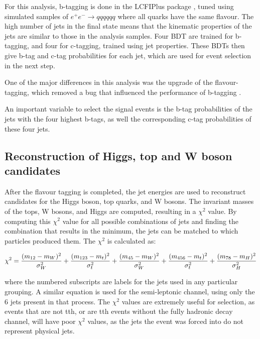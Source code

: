 For this analysis, b-tagging is done in the LCFIPlus package \cite{lcfiplus}, tuned using simulated samples of $e^+ e^- \rightarrow qqqqqq$ where all quarks have the same flavour. The high number of jets in the final state means that the kinematic properties of the jets are similar to those in the analysis samples. Four \acrfull{BDT} are trained for b-tagging, and four for c-tagging, trained using jet properties. These \acrshort{BDT}s then give b-tag and c-tag probabilities for each jet, which are used for event selection in the next step. %

One of the major differences in this analysis was the upgrade of the flavour-tagging, which removed a bug that influenced the performance of b-tagging \cite{clic-yukawa-coupling-2014}.

An important variable to select the signal events is the b-tag probabilities of the jets with the four highest b-tags, as well the corresponding c-tag probabilities of these four jets.

\subsection{Reconstruction of Higgs, top and W boson candidates}
\label{section:chi-squared}
After the flavour tagging is completed, the jet energies are used to reconstruct candidates for the Higgs boson, top quarks, and W bosons. The invariant masses of the tops, W bosons, and Higgs are computed, resulting in a $\chi^2$ value. By computing this $\chi^2$ value for all possible combinations of jets and finding the combination that results in the minimum, the jets can be matched to which particles produced them. The $\chi^2$ is calculated as:

\begin{equation}
  \centering
	\chi^2 = \frac{(m_{12} - m_W)^2}{\sigma^2_W} + \frac{(m_{123} - m_t)^2}{\sigma^2_{t}} + \frac{(m_{45} - m_W)^2}{\sigma^2_W} + \frac{(m_{456} - m_t)^2}{\sigma^2_{t}} + \frac{(m_{78} - m_H)^2}{\sigma^2_H}
\label{eq:chi-square}
\end{equation}

where the numbered subscripts are labels for the jets used in any particular grouping. A similar equation is used for the semi-leptonic channel, using only the 6 jets present in that process. The $\chi^2$ values are extremely useful for selection, as events that are not tth, or are tth events without the fully hadronic decay channel, will have poor $\chi^2$ values, as the jets the event was forced into do not represent physical jets.

